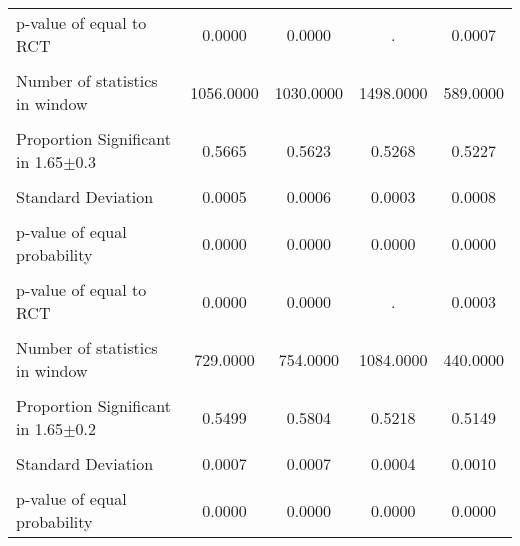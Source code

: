{\begin{tabular}{l*{4}{c}}
p-value of equal to RCT&   0.0000         &   0.0000         &        .         &   0.0007         \\
                &                  &                  &                  &                  \\
Number of statistics in window&1056.0000         &1030.0000         &1498.0000         & 589.0000         \\
                &                  &                  &                  &                  \\
\hline Proportion Significant in 1.65$\pm$0.3&   0.5665         &   0.5623         &   0.5268         &   0.5227         \\
                &                  &                  &                  &                  \\
Standard Deviation&   0.0005         &   0.0006         &   0.0003         &   0.0008         \\
                &                  &                  &                  &                  \\
p-value of equal probability&   0.0000         &   0.0000         &   0.0000         &   0.0000         \\
                &                  &                  &                  &                  \\
p-value of equal to RCT&   0.0000         &   0.0000         &        .         &   0.0003         \\
                &                  &                  &                  &                  \\
Number of statistics in window& 729.0000         & 754.0000         &1084.0000         & 440.0000         \\
                &                  &                  &                  &                  \\
\hline Proportion Significant in 1.65$\pm$0.2&   0.5499         &   0.5804         &   0.5218         &   0.5149         \\
                &                  &                  &                  &                  \\
Standard Deviation&   0.0007         &   0.0007         &   0.0004         &   0.0010         \\
                &                  &                  &                  &                  \\
p-value of equal probability&   0.0000         &   0.0000         &   0.0000         &   0.0000         \\

\end{tabular}}
